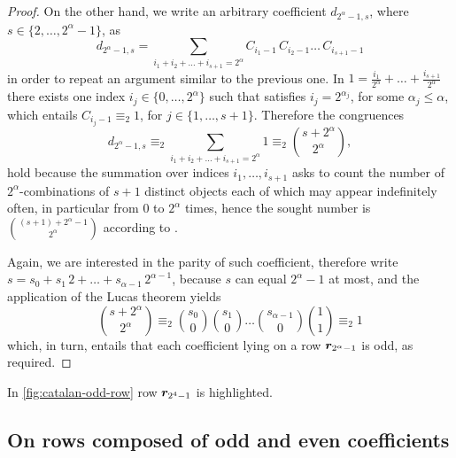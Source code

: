 \begin{proof}
    On the other hand, we write an arbitrary coefficient $d_{2^{\alpha}-1,s}$, where
    $s\in\lbrace{2,\ldots,2^{\alpha}-1}\rbrace$, as
    \begin{displaymath}
        d_{2^{\alpha}-1,s} = \sum_{i_{1}+i_{2}+\ldots+i_{s+1}=2^{\alpha}}
            {C_{i_{1}-1}\,C_{i_{2}-1}\ldots\,C_{i_{s+1}-1}}
    \end{displaymath}
    in order to repeat an argument similar to the previous one. In
    $\displaystyle 1 = \frac{i_{1}}{2^{\alpha}}+\ldots+\frac{i_{s+1}}{2^{\alpha}}$ there exists one
    index $i_{j}\in\lbrace 0,\ldots,2^{\alpha}\rbrace$ such that satisfies
    $i_{j}=2^{\alpha_{j}}$, for some $\alpha_{j}\leq\alpha$, which entails
    $C_{i_{j}-1}\equiv_{2}1$, for $j\in\lbrace1,\ldots,s+1\rbrace$. Therefore the congruences
    \begin{displaymath}
        d_{2^{\alpha}-1,s} \equiv_{2} \sum_{i_{1}+i_{2}+\ldots+i_{s+1}=2^{\alpha}}{1}
            \equiv_{2} {{s+2^{\alpha}}\choose{2^{\alpha}}},
    \end{displaymath}
    hold because the summation over indices $i_{1},\ldots,i_{s+1}$ asks to count the
    number of $2^{\alpha}$-combinations of $s+1$ distinct objects each of
    which may appear indefinitely often, in particular from $0$ to $2^{\alpha}$ times,
    hence the sought number is ${{(s+1)+2^{\alpha}-1}\choose{2^{\alpha}}}$
    according to \cite[equation 10 at page 7]{riordan:intro:combinatorial:analysis}.

    Again, we are interested in the parity of such coefficient, therefore
    write $s=s_{0}+s_{1}\,2+\ldots+s_{\alpha-1}\,2^{\alpha-1}$, because $s$ can equal
    $2^{\alpha}-1$ at most, and the application of the Lucas theorem yields
    \begin{displaymath}
        {{s+2^{\alpha}}\choose{2^{\alpha}}}\equiv_{2}
            {{s_{0}}\choose{0}}{{s_{1}}\choose{0}} \ldots
                {{s_{\alpha-1}}\choose{0}}{{1}\choose{1}}\equiv_{2}1
    \end{displaymath}
    which, in turn, entails that each coefficient lying on a row
    $\boldsymbol{r}_{2^{\alpha}-1}$ is odd, as required.
\end{proof}


In \autoref{fig:catalan-odd-row} row $\boldsymbol{r}_{2^{4}-1}$ is highlighted.

\subsection{On rows composed of odd and even coefficients}

